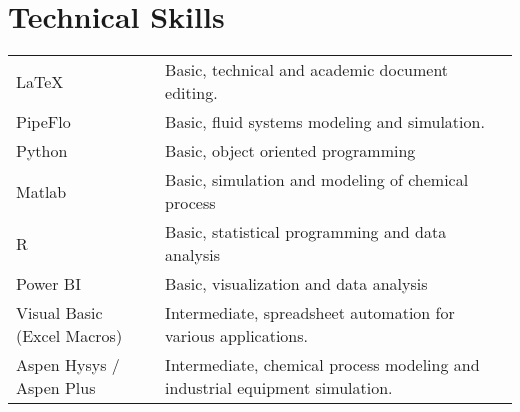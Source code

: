 \documentclass[a4paper,12pt]{article}
\begin{document}

\section{Technical Skills}
\begin{tabularx}{\linewidth}{@{}l X@{}}
\LaTeX &  \normalsize{Basic, technical and academic document editing.}\\
PipeFlo &  \normalsize{Basic, fluid systems modeling and simulation.}\\
Python &  \normalsize{Basic, object oriented programming}\\
Matlab &  \normalsize{Basic, simulation and modeling of chemical process}\\
R &  \normalsize{Basic, statistical programming and data analysis}\\
Power BI &  \normalsize{Basic, visualization and data analysis}\\
Visual Basic (Excel Macros)  &  \normalsize{Intermediate, spreadsheet automation for various applications.}\\ 
Aspen Hysys / Aspen Plus  &  \normalsize{Intermediate, chemical process modeling and industrial equipment simulation.}\\  
\end{tabularx}
\vfill
{}
\end{document}
